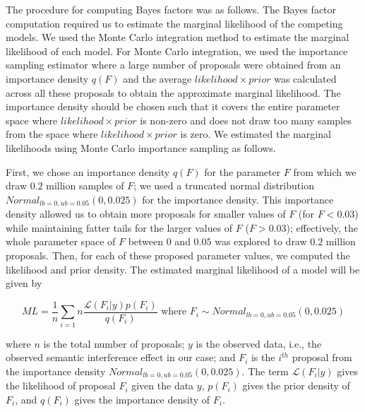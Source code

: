 \documentclass[review,preprint,12pt,authoryear,floatsintext]{elsarticle}
\begin{document}
{{The procedure for computing Bayes factors was as follows. The Bayes factor computation required us to estimate the marginal likelihood of the competing models. We used the Monte Carlo integration method to estimate the marginal likelihood of each model. For Monte Carlo integration, we used the importance sampling estimator where a large number of proposals were obtained from an importance density $q(F)$ and the average $likelihood \times prior$ was calculated across all these proposals to obtain the approximate marginal likelihood. The importance density should be chosen such that it covers the entire parameter space where $likelihood \times prior$ is non-zero and does not draw too many samples from the space where $likelihood \times prior$ is zero. We estimated the marginal likelihoods using Monte Carlo importance sampling as follows. 

First, we chose an importance density $q(F)$ for the parameter $F$ from which we draw $0.2$ million samples of $F$; we used a truncated normal distribution $Normal_{lb=0,ub=0.05}(0,0.025)$ for the importance density. This importance density allowed us to obtain more proposals for smaller values of $F$ (for $F<0.03$) while maintaining fatter tails for the larger values of $F$ ($F>0.03$); effectively, the whole parameter space of $F$ between $0$ and $0.05$ was explored to draw $0.2$ million proposals. Then, for each of these proposed parameter values, we computed the likelihood and prior density. The estimated marginal likelihood of a model will be given by

\begin{equation}
ML = \frac{1}{n} \sum_{i=1}{n} \frac{\mathcal{L}(F_i|y) p(F_i)}{q(F_i)} \text{ where } F_i \sim Normal_{lb=0,ub=0.05}(0, 0.025)
\end{equation}

\noindent where $n$ is the total number of proposals; $y$ is the observed data, i.e., the observed semantic interference effect in our case; and $F_i$ is the $i^{th}$ proposal from the importance density $Normal_{lb=0,ub=0.05}(0, 0.025) $. 
The term $\mathcal{L}(F_i|y)$ gives the likelihood of proposal $F_i$ given the data $y$, $p(F_i)$ gives the prior density of $F_i$, and $q(F_i)$ gives the importance density of $F_i$.

}}
\end{document}
